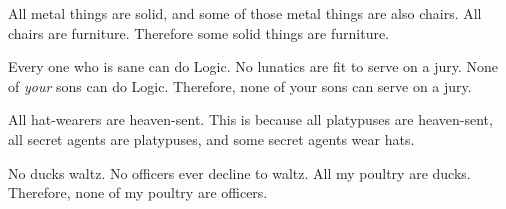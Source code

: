 \begin{exercises}

\item All metal things are solid, and some of those metal things are also chairs. All chairs are furniture. Therefore some solid things are furniture. 





\item \label{itm:sons} Every one who is sane can do Logic. No lunatics are fit to serve on a jury. None of \textit{your} sons can do Logic. Therefore, none of your sons can serve on a jury.


\item All hat-wearers are heaven-sent. This is because all platypuses are heaven-sent, all secret agents are platypuses, and some secret agents wear hats. 



\item \label{itm:ducks} No ducks waltz. No officers ever decline to waltz. All my poultry are ducks. Therefore, none of my poultry are officers.





\end{exercises}
